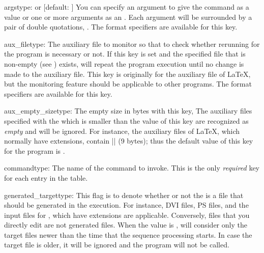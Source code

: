 \documentclass[draft]{llmk-doc}
\begin{document}
\begin{confkey}{args}{type:  or }
  [default: \code{["\%T"]}]
You can specify an argument to give the command as a  value or one
or more arguments as an . Each argument will be
surrounded by a pair of double quotations, \eg {}. The format
specifiers are available for this key.
\end{confkey}

\begin{confkey}{aux\_file}{type: }
The auxiliary file to monitor so that to check whether rerunning for the
program is necessary or not. If this key is set and the specified file that is
non-empty (see ) exists,  will repeat the
program execution until no change is made to the auxiliary file. This key is
originally for the auxiliary file of {\LaTeX}, but the monitoring feature
should be applicable to other programs. The format specifiers are available
for this key.
\end{confkey}

\begin{confkey}{aux\_empty\_size}{type: }
The empty size in bytes with this key, The auxiliary files specified with the
 which is smaller than the value of this key are recognized as
\emph{empty} and will be ignored. For instance, the auxiliary files of {\LaTeX},
which normally have  extensions, contain
|\textvisiblespace{}| (9 bytes); thus the default
value of this key for the  program is .
\end{confkey}

\begin{confkey}{command}{type: }
The name of the command to invoke. This is the only \emph{required} key for
each entry in the  table.
\end{confkey}

\begin{confkey}{generated\_target}{type: }
This flag is to denote whether or not the  is a file that should
be generated in the  execution. For instance, DVI files, PS files,
and the input files for , which have  extensions are
applicable. Conversely, files that you directly edit are not generated files.
When the value is ,  will consider only the target files
newer than the time that the sequence processing starts. In case the target
file is older, it will be ignored and the program will not be called.
\end{confkey}
\end{document}
